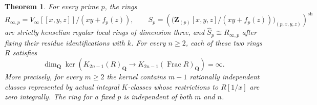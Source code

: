 \documentclass[11pt,a4paper]{article}
\newtheorem{theorem}{Theorem}[section]
\theoremstyle{remark}
\newcommand{\Q}{\mathbf Q}
\newcommand{\Z}{\mathbf Z}
\newcommand{\Frac}{\operatorname{Frac}}
\begin{document}
\begin{theorem}\label{thm:strictallprimeallodd}
For every prime $p$, the rings
\[
 R_{\infty,p}=V_\infty[[x,y,z]]/(xy+f_p(z)),\qquad
 S_p=\left(
  \bigl(\Z_{(p)}[x,y,z]/(xy+f_p(z))\bigr)_{(p,x,y,z)}
       \right)^{\mathrm{sh}}
\]
are strictly henselian regular local rings of dimension three,
and $\widehat S_p\cong R_{\infty,p}$ after fixing their residue
identifications with $k$.
For every $n\geq2$, each of these two rings $R$ satisfies
\[
 \dim_{\Q}\ker\left(
 K_{2n-1}(R)_{\Q}\longrightarrow
 K_{2n-1}(\Frac R)_{\Q}\right)=\infty.
\]
More precisely, for every $m\geq2$ the kernel contains $m-1$
rationally independent classes represented by actual integral
$K$-classes whose restrictions to $R[1/x]$ are zero integrally.
The ring for a fixed $p$ is independent of both $m$ and $n$.
\end{theorem}
\end{document}
